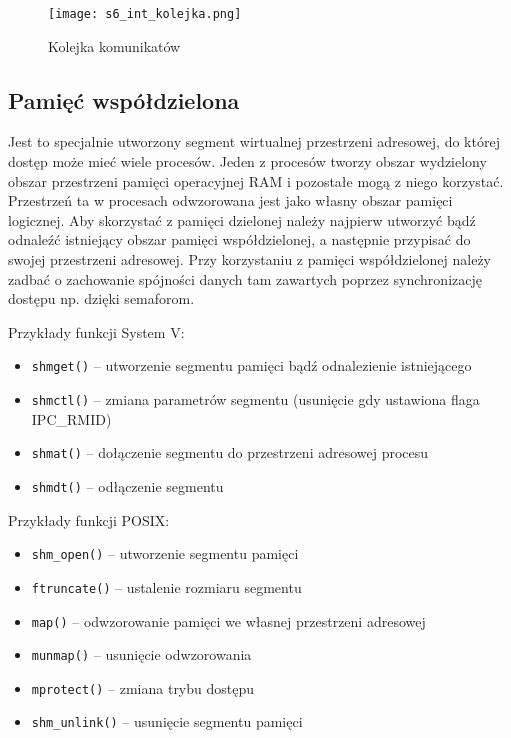 \begin{figure}[!h]
\centering
\texttt{[image: s6\_int\_kolejka.png]}
\caption{Kolejka komunikatów}
\end{figure}

\subsection{Pamięć współdzielona}

Jest to specjalnie utworzony segment wirtualnej przestrzeni adresowej, do której dostęp może mieć wiele procesów. Jeden z procesów tworzy obszar wydzielony obszar przestrzeni pamięci operacyjnej RAM i pozostałe mogą z niego korzystać. Przestrzeń ta w procesach odwzorowana jest jako własny obszar pamięci logicznej. Aby skorzystać z pamięci dzielonej należy najpierw utworzyć bądź odnaleźć istniejący obszar pamięci współdzielonej, a następnie przypisać do swojej przestrzeni adresowej. Przy korzystaniu z pamięci współdzielonej należy zadbać o zachowanie spójności danych tam zawartych poprzez synchronizację dostępu np. dzięki semaforom.

Przykłady funkcji System V:
\begin{itemize}
	\item \texttt{shmget()} -- utworzenie segmentu pamięci bądź odnalezienie istniejącego
    \item \texttt{shmctl()} -- zmiana parametrów segmentu (usunięcie gdy ustawiona flaga IPC\_RMID)
    \item \texttt{shmat()} -- dołączenie segmentu do przestrzeni adresowej procesu
    \item \texttt{shmdt()} -- odłączenie segmentu
\end{itemize}

Przykłady funkcji POSIX:
\begin{itemize}
	\item \texttt{shm\_open()} -- utworzenie segmentu pamięci
    \item \texttt{ftruncate()} -- ustalenie rozmiaru segmentu
    \item \texttt{map()} -- odwzorowanie pamięci we własnej przestrzeni adresowej
    \item \texttt{munmap()} -- usunięcie odwzorowania
    \item \texttt{mprotect()} -- zmiana trybu dostępu
    \item \texttt{shm\_unlink()} -- usunięcie segmentu pamięci
\end{itemize}

